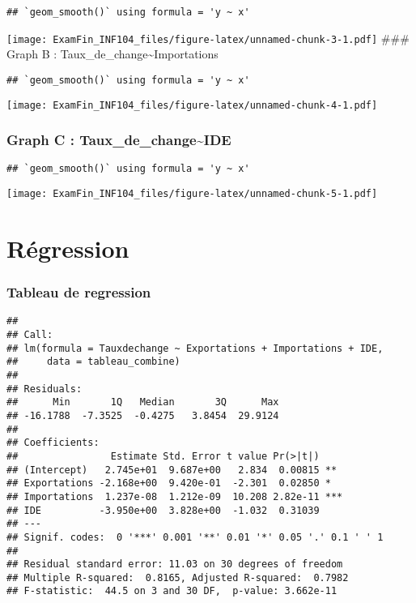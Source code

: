 \documentclass[
]{article}
\begin{document}
\begin{verbatim}
## `geom_smooth()` using formula = 'y ~ x'
\end{verbatim}

\texttt{[image: ExamFin\_INF104\_files/figure-latex/unnamed-chunk-3-1.pdf]}
\#\#\# Graph B : Taux\_de\_change\textasciitilde Importations

\begin{verbatim}
## `geom_smooth()` using formula = 'y ~ x'
\end{verbatim}

\texttt{[image: ExamFin\_INF104\_files/figure-latex/unnamed-chunk-4-1.pdf]}

\hypertarget{graph-c-taux_de_changeide}{%
\subsubsection{Graph C :
Taux\_de\_change\textasciitilde IDE}\label{graph-c-taux_de_changeide}}

\begin{verbatim}
## `geom_smooth()` using formula = 'y ~ x'
\end{verbatim}

\texttt{[image: ExamFin\_INF104\_files/figure-latex/unnamed-chunk-5-1.pdf]}

\hypertarget{ruxe9gression}{%
\section{Régression}\label{ruxe9gression}}

\hypertarget{tableau-de-regression}{%
\subsubsection{Tableau de regression}\label{tableau-de-regression}}

\begin{verbatim}
## 
## Call:
## lm(formula = Tauxdechange ~ Exportations + Importations + IDE, 
##     data = tableau_combine)
## 
## Residuals:
##      Min       1Q   Median       3Q      Max 
## -16.1788  -7.3525  -0.4275   3.8454  29.9124 
## 
## Coefficients:
##                Estimate Std. Error t value Pr(>|t|)    
## (Intercept)   2.745e+01  9.687e+00   2.834  0.00815 ** 
## Exportations -2.168e+00  9.420e-01  -2.301  0.02850 *  
## Importations  1.237e-08  1.212e-09  10.208 2.82e-11 ***
## IDE          -3.950e+00  3.828e+00  -1.032  0.31039    
## ---
## Signif. codes:  0 '***' 0.001 '**' 0.01 '*' 0.05 '.' 0.1 ' ' 1
## 
## Residual standard error: 11.03 on 30 degrees of freedom
## Multiple R-squared:  0.8165, Adjusted R-squared:  0.7982 
## F-statistic:  44.5 on 3 and 30 DF,  p-value: 3.662e-11
\end{verbatim}
\end{document}
